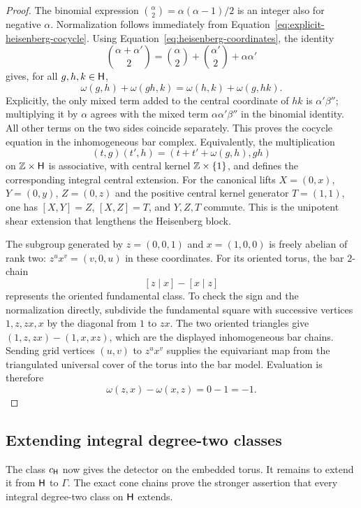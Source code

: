\begin{proof}
The binomial expression $\binom{\alpha}{2}=\alpha(\alpha-1)/2$
is an integer also for negative $\alpha$.  Normalization follows
immediately from Equation~\eqref{eq:explicit-heisenberg-cocycle}.
Using Equation~\eqref{eq:heisenberg-coordinates}, the identity
\[
 \binom{\alpha+\alpha'}{2}
 =\binom{\alpha}{2}+\binom{\alpha'}{2}+\alpha\alpha'
\]
gives, for all $g,h,k\in\mathsf H$,
\[
 \omega(g,h)+\omega(gh,k)
       =\omega(h,k)+\omega(g,hk).
\]
Explicitly, the only mixed term added to the central coordinate
of $hk$ is $\alpha'\beta''$; multiplying it by $\alpha$ agrees
with the mixed term $\alpha\alpha'\beta''$ in the binomial
identity.  All other terms on the two sides coincide separately.
This proves the cocycle equation in the inhomogeneous bar complex.
Equivalently, the multiplication
\[
 (t,g)(t',h)=(t+t'+\omega(g,h),gh)
\]
on $\mathbb Z\times\mathsf H$ is associative, with central kernel
$\mathbb Z\times\{1\}$, and defines the corresponding integral
central extension.  For the canonical lifts
$X=(0,x)$, $Y=(0,y)$, $Z=(0,z)$ and the positive central
kernel generator $T=(1,1)$, one has
$[X,Y]=Z$, $[X,Z]=T$, and $Y,Z,T$ commute.  This is the
unipotent shear extension that lengthens the Heisenberg block.

The subgroup generated by
$z=(0,0,1)$ and $x=(1,0,0)$ is freely abelian of rank two:
$z^u x^v=(v,0,u)$ in these coordinates.  For its oriented torus,
the bar $2$-chain
\[
 [z\mid x]-[x\mid z]
\]
represents the oriented fundamental class.  To check the sign and
the normalization directly, subdivide the fundamental square with
successive vertices $1,z,zx,x$ by the diagonal from $1$ to $zx$.
The two oriented triangles give $(1,z,zx)-(1,x,xz)$, which are
the displayed inhomogeneous bar chains.  Sending grid vertices
$(u,v)$ to $z^u x^v$ supplies the equivariant map from the
triangulated universal cover of the torus into the bar model.
Evaluation is therefore
\[
 \omega(z,x)-\omega(x,z)=0-1=-1.
\]
\end{proof}

\subsection{Extending integral degree-two classes}

The class $c_{\mathsf H}$ now gives the detector on the embedded torus.
It remains to extend it from $\mathsf H$ to $\Gamma$.  The exact cone chains
prove the stronger assertion that every integral degree-two class on
$\mathsf H$ extends.

